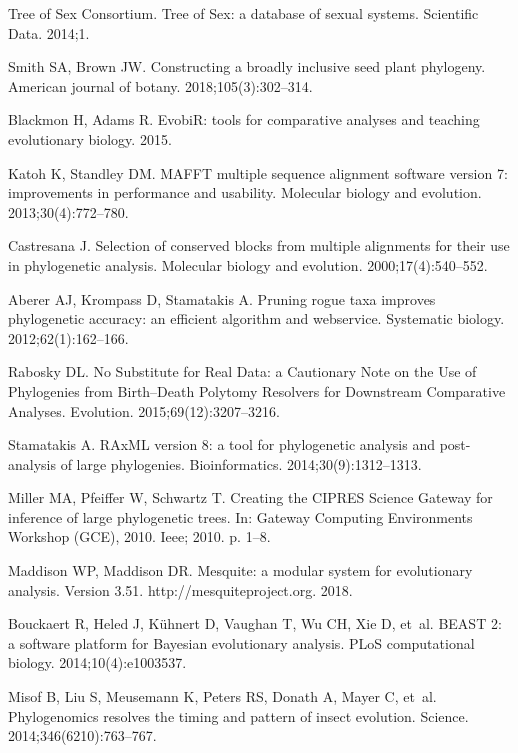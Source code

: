 \documentclass[]{rsos}%
\begin{document}
\begin{thebibliography}{9}
{Tree of Sex Consortium}.
 Tree of Sex: a database of sexual systems.
 Scientific Data. 2014;1.

Smith SA, Brown JW.
 Constructing a broadly inclusive seed plant phylogeny.
 American journal of botany. 2018;105(3):302--314.

Blackmon H, Adams R. EvobiR: tools for comparative analyses and teaching
  evolutionary biology. 2015.

Katoh K, Standley DM.
 MAFFT multiple sequence alignment software version 7: improvements in
  performance and usability.
 Molecular biology and evolution. 2013;30(4):772--780.

Castresana J.
 Selection of conserved blocks from multiple alignments for their use
  in phylogenetic analysis.
 Molecular biology and evolution. 2000;17(4):540--552.

Aberer AJ, Krompass D, Stamatakis A.
 Pruning rogue taxa improves phylogenetic accuracy: an efficient
  algorithm and webservice.
 Systematic biology. 2012;62(1):162--166.

Rabosky DL.
 No Substitute for Real Data: a Cautionary Note on the Use of
  Phylogenies from Birth--Death Polytomy Resolvers for Downstream Comparative
  Analyses.
 Evolution. 2015;69(12):3207--3216.

Stamatakis A.
 RAxML version 8: a tool for phylogenetic analysis and post-analysis
  of large phylogenies.
 Bioinformatics. 2014;30(9):1312--1313.

Miller MA, Pfeiffer W, Schwartz T.
 Creating the CIPRES Science Gateway for inference of large
  phylogenetic trees.
 In: Gateway Computing Environments Workshop (GCE), 2010. Ieee; 2010.
  p. 1--8.

Maddison WP, Maddison DR.
 Mesquite: a modular system for evolutionary analysis. Version 3.51.
 http://mesquiteproject.org. 2018.

Bouckaert R, Heled J, K{\"u}hnert D, Vaughan T, Wu CH, Xie D, et~al.
 BEAST 2: a software platform for Bayesian evolutionary analysis.
 PLoS computational biology. 2014;10(4):e1003537.

Misof B, Liu S, Meusemann K, Peters RS, Donath A, Mayer C, et~al.
 Phylogenomics resolves the timing and pattern of insect evolution.
 Science. 2014;346(6210):763--767.


\end{thebibliography}
\end{document}
